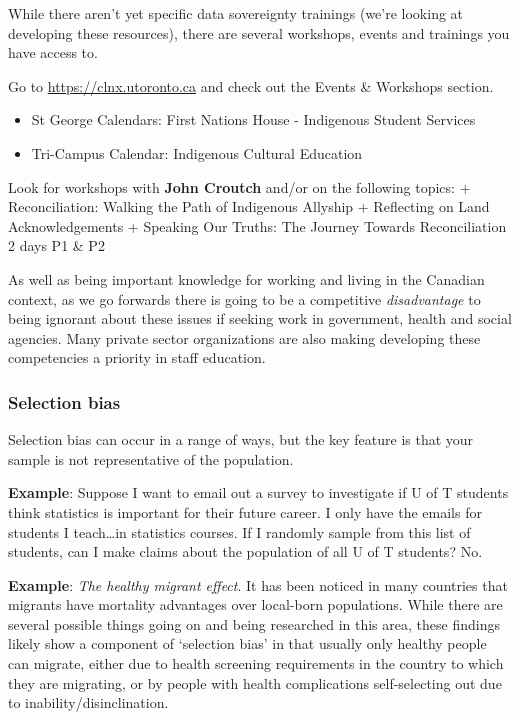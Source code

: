 \documentclass[
  openany]{book}
\providecommand{\tightlist}{%
  \setlength{\itemsep}{0pt}\setlength{\parskip}{0pt}}
\begin{document}
While there aren't yet specific data sovereignty trainings (we're looking at developing these resources), there are several workshops, events and trainings you have access to.

Go to \url{https://clnx.utoronto.ca} and check out the Events \& Workshops section.

\begin{itemize}
\tightlist
\item
  St George Calendars: First Nations House - Indigenous Student Services
\item
  Tri-Campus Calendar: Indigenous Cultural Education
\end{itemize}

Look for workshops with \textbf{John Croutch} and/or on the following topics:
+ Reconciliation: Walking the Path of Indigenous Allyship
+ Reflecting on Land Acknowledgements
+ Speaking Our Truths: The Journey Towards Reconciliation \textbar{} 2 days P1 \& P2

As well as being important knowledge for working and living in the Canadian context, as we go forwards there is going to be a competitive \emph{disadvantage} to being ignorant about these issues if seeking work in government, health and social agencies. Many private sector organizations are also making developing these competencies a priority in staff education.

\hypertarget{selection-bias}{%
\subsubsection{Selection bias}\label{selection-bias}}

Selection bias can occur in a range of ways, but the key feature is that your sample is not representative of the population.

\textbf{Example}: Suppose I want to email out a survey to investigate if U of T students think statistics is important for their future career. I only have the emails for students I teach\ldots in statistics courses. If I randomly sample from this list of students, can I make claims about the population of all U of T students? No.

\textbf{Example}: \emph{The healthy migrant effect}. It has been noticed in many countries that migrants have mortality advantages over local-born populations. While there are several possible things going on and being researched in this area, these findings likely show a component of `selection bias' in that usually only healthy people can migrate, either due to health screening requirements in the country to which they are migrating, or by people with health complications self-selecting out due to inability/disinclination.
\end{document}
